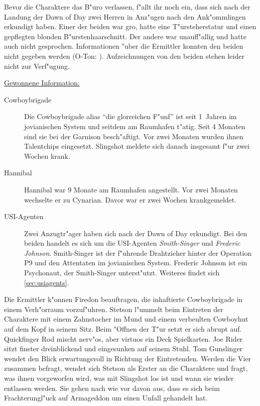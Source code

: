 Bevor die Charaktere das B"uro verlassen, f"allt ihr noch ein, dass sich nach der Landung der Dawn of Day zwei Herren in Anz"ugen nach den Ank"ommlingen erkundigt haben. Einer der beiden war gro\3, hatte eine T"ursteherstatur und einen gepflegten blonden B"urstenhaarschnitt. Der andere war unauff"allig und hatte auch nicht gesprochen. Informationen "uber die Ermittler konnten den beiden nicht gegeben werden (O-Ton: ). Aufzeichnungen von den beiden stehen leider nicht zur Verf"ugung.

\begin{remarks}
	\underline{Gewonnene Information:}
	
	\begin{description}
		\item[Cowboybrigade] Die Cowboybrigade alias ``die glorreichen F"unf'' ist seit 1\half~Jahren im jovianischen System und seitdem am 
			Raumhafen t"atig. Seit 4 Monaten sind sie bei der Garnison besch"aftigt. Vor zwei Monaten wurden ihnen Talentchips eingesetzt. Slingshot meldete sich danach insgesamt f"ur zwei Wochen krank.
		\item[Hannibal] Hannibal war 9 Monate am Raumhafen angestellt. Vor zwei Monaten wechselte er zu Cynarian. Davor war er 	
			zwei Wochen krankgemeldet.
		\item[USI-Agenten] Zwei Anzugtr"ager haben sich nach der Dawn of Day erkundigt. Bei den beiden handelt es sich um die USI-Agenten  
			\emph{Smith-Singer} und \emph{Frederic Johnson}. Smith-Singer ist der f"uhrende Drahtzieher hinter der Operation P9 und den Attentaten im jovianischen System. Frederic Johnson ist ein Psychonaut, der Smith-Singer unterst"utzt. Weiteres findet sich \cref{sec:usiagents}.
	\end{description}
\end{remarks}


Die Ermittler k"onnen Firedon beauftragen, die inhaftierte Cowboybrigade in einem Verh"orraum vorzuf"uhren. Stetson l"ummelt beim Eintreten der Charaktere mit einem Zahnstocher im Mund und einem verbeulten Cowboyhut auf dem Kopf in seinem Sitz. Beim "Offnen der T"ur setzt er sich abrupt auf. Quickfinger Rod mischt nerv"os, aber virtuos ein Deck Spielkarten. Joe Rider sitzt finster dreinblickend und eingesunken auf seinem Stuhl. Tom Gunslinger wendet den Blick erwartungsvoll in Richtung der Eintretenden. Werden die Vier zusammen befragt, wendet sich Stetson als Erster an die Charaktere und fragt, was ihnen vorgeworfen wird, was mit Slingshot los ist und wann sie wieder entlassen werden. Sie gehen nach wie vor davon aus, dass es sich beim Frachterungl"uck auf Armageddon um einen Unfall gehandelt hat.

